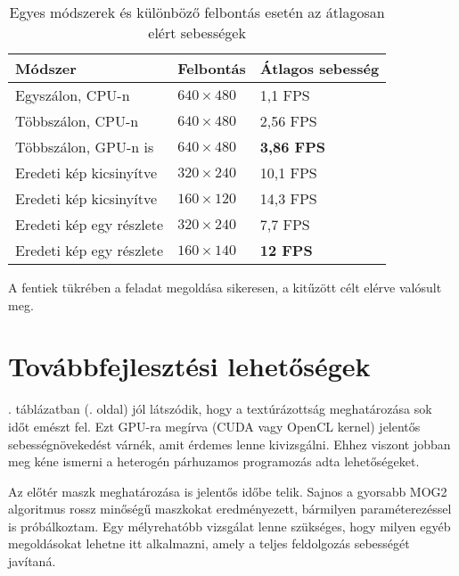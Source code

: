 \begin{table}[tbh]
\centering

\begin{tabular}{|l|l|l|}
\hline
\textbf{Módszer} & \textbf{Felbontás} & \textbf{Átlagos sebesség} \\ \hline\hline

Egyszálon, CPU-n & $640\times 480$ & 1,1 FPS \\ \hline
Többszálon, CPU-n & $640\times 480$ & 2,56 FPS \\ \hline
Többszálon, GPU-n is & $640\times 480$ & \textbf{3,86 FPS} \\ \hline\hline

Eredeti kép kicsinyítve & $320\times 240$ & 10,1 FPS \\ \hline
Eredeti kép kicsinyítve & $160\times 120$ & 14,3 FPS \\ \hline\hline

Eredeti kép egy részlete & $320\times 240$ & 7,7 FPS \\ \hline
Eredeti kép egy részlete & $160\times 140$ & \textbf{12 FPS} \\ \hline

\end{tabular}

\caption{Egyes módszerek és különböző felbontás esetén az átlagosan elért sebességek \label{table:results}}
\end{table}

A fentiek tükrében a feladat megoldása sikeresen, a kitűzött célt elérve valósult meg.

\section{Továbbfejlesztési lehetőségek}

. táblázatban (\pageref{table:result_scene1_multi_gpu}. oldal) jól látszódik, hogy a textúrázottság meghatározása sok időt emészt fel. Ezt GPU-ra megírva (CUDA vagy OpenCL kernel) jelentős sebességnövekedést várnék, amit érdemes lenne kivizsgálni. Ehhez viszont jobban meg kéne ismerni a heterogén párhuzamos programozás adta lehetőségeket.

Az előtér maszk meghatározása is jelentős időbe telik. Sajnos a gyorsabb MOG2 algoritmus rossz minőségű maszkokat eredményezett, bármilyen paraméterezéssel is próbálkoztam. Egy mélyrehatóbb vizsgálat lenne szükséges, hogy milyen egyéb megoldásokat lehetne itt alkalmazni, amely a teljes feldolgozás sebességét javítaná.

